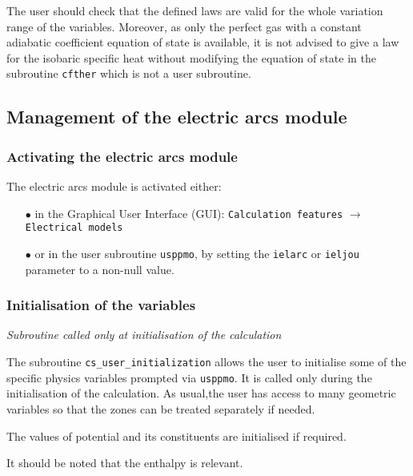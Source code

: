 {{{The user should check that the defined laws are valid for
the whole variation range of the variables. Moreover, as only the perfect gas with a constant
adiabatic coefficient equation of state is available, it is not advised to give a law for the isobaric
specific heat without modifying the equation of state in the subroutine \texttt{cfther} which is not
a user subroutine.

\subsection{Management of the electric arcs module}

\subsubsection{Activating the electric arcs module}\label{sec:acti-lag}

The electric arcs module is activated either:
%
\begin{itemize}
 \item [$\bullet$] in the Graphical User Interface (GUI): \texttt{Calculation features} $\rightarrow$ \texttt{Electrical models}
 \item [$\bullet$] or in the user subroutine \texttt{usppmo}, by setting the \texttt{ielarc} or \texttt{ieljou} parameter to a non-null value.
\end{itemize}

\subsubsection{Initialisation of the variables}

\noindent
\textit{Subroutine called only at initialisation of the calculation}

The subroutine \texttt{cs\_user\_initialization} allows the user to initialise some of the specific physics variables prompted via \texttt{usppmo}. It is called only during the initialisation of the calculation. As usual,the user has access to many geometric variables so
 that the zones can be treated separately if needed.

The values of potential and its constituents are initialised if required.

It should be noted that the enthalpy is relevant.

}}}
